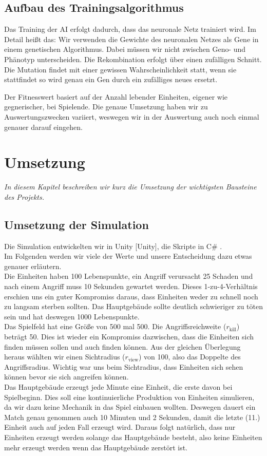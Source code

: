 \documentclass[
	12pt,
	a4paper,
	BCOR10mm,
	DIV14,
	headsepline,
	usegeometry,
]{scrreprt}
\begin{document}
\section{Aufbau des Trainingsalgorithmus}
Das Training der AI erfolgt dadurch, dass das neuronale Netz trainiert wird.
Im Detail heißt das: Wir verwenden die Gewichte des neuronalen Netzes als Gene in einem genetischen Algorithmus.
Dabei müssen wir nicht zwischen Geno- und Phänotyp unterscheiden.
Die Rekombination erfolgt über einen zufälligen Schnitt.
Die Mutation findet mit einer gewissen Wahrscheinlichkeit statt, wenn sie stattfindet so wird genau ein Gen durch ein zufälliges neues ersetzt.

Der Fitnesswert basiert auf der Anzahl lebender Einheiten, eigener wie gegnerischer, bei Spielende.
Die genaue Umsetzung haben wir zu Auswertungszwecken variiert, weswegen wir in der Auswertung auch noch einmal genauer darauf eingehen.

\chapter{Umsetzung}
\label{Umsetzung}

\textit{%
In diesem Kapitel beschreiben wir kurz die Umsetzung der wichtigsten Bausteine des Projekts.
}

\bigskip

\section{Umsetzung der Simulation}

Die Simulation entwickelten wir in Unity [Unity], die Skripte in C\# .\\
Im Folgenden werden wir viele der Werte und unsere Entscheidung dazu etwas genauer erläutern.\\
Die Einheiten haben 100 Lebenspunkte, ein Angriff verursacht 25 Schaden und nach einem Angriff muss 10 Sekunden gewartet werden. Dieses 1-zu-4-Verhältnis erschien uns ein guter Kompromiss daraus, dass Einheiten weder zu schnell noch zu langsam sterben sollten. Das Hauptgebäude sollte deutlich schwieriger zu töten sein und hat deswegen 1000 Lebenspunkte.\\
Das Spielfeld hat eine Größe von 500 mal 500. Die Angriffsreichweite ($r_{\text{kill}}$) beträgt 50. Dies ist wieder ein Kompromiss dazwischen, dass die Einheiten sich finden müssen sollen und auch finden können. Aus der gleichen Überlegung heraus wählten wir einen Sichtradius ($r_{\text{view}}$) von 100, also das Doppelte des Angriffsradius. Wichtig war uns beim Sichtradius, dass Einheiten sich sehen können bevor sie sich angreifen können.\\
Das Hauptgebäude erzeugt jede Minute eine Einheit, die erste davon bei Spielbeginn. Dies soll eine kontinuierliche Produktion von Einheiten simulieren, da wir dazu keine Mechanik in das Spiel einbauen wollten. Deswegen dauert ein Match genau genommen auch 10 Minuten und 2 Sekunden, damit die letzte (11.) Einheit auch auf jeden Fall erzeugt wird. Daraus folgt natürlich, dass nur Einheiten erzeugt werden solange das Hauptgebäude besteht, also keine Einheiten mehr erzeugt werden wenn das Hauptgebäude zerstört ist.
\end{document}
